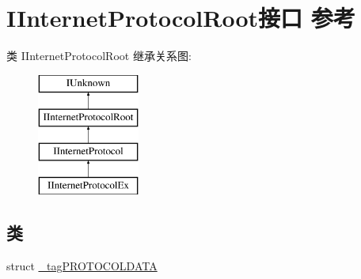 \hypertarget{interface_i_internet_protocol_root}{}\section{I\+Internet\+Protocol\+Root接口 参考}
\label{interface_i_internet_protocol_root}
类 I\+Internet\+Protocol\+Root 继承关系图\+:\begin{figure}[H]
\begin{center}
\leavevmode
\includegraphics[height=4.000000cm]{interface_i_internet_protocol_root}
\end{center}
\end{figure}
\subsection*{类}
\begin{DoxyCompactItemize}
\item 
struct \hyperlink{struct_i_internet_protocol_root_1_1__tag_p_r_o_t_o_c_o_l_d_a_t_a}{\+\_\+tag\+P\+R\+O\+T\+O\+C\+O\+L\+D\+A\+TA}
\end{DoxyCompactItemize}
